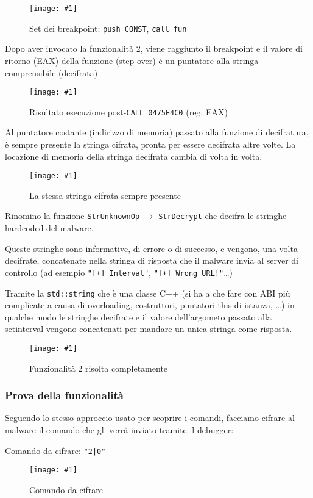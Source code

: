 \documentclass[
    a4paper, %
    11pt %
]{article}
\newcommand{\pic}[4]{\begin{figure}[H]
            \centering
            \texttt{[image: \#1]}
            \caption{#2}
            \label{fig:#1}
            \end{figure}}
\begin{document}
            \pic{adv_brkp_encfn}{Set dei breakpoint: \texttt{push CONST}, \texttt{call fun}}{15cm}{4cm}

            Dopo aver invocato la funzionalità 2, viene raggiunto il breakpoint e il valore di ritorno (EAX)
            della funzione (step over) è un puntatore alla stringa comprensibile (decifrata)

            \pic{adv_decrypt}{Risultato esecuzione post-\texttt{CALL 0475E4C0} (reg. EAX)}{18cm}{1.5cm}

            Al puntatore costante (indirizzo di memoria) passato alla funzione di decifratura, è sempre presente la stringa cifrata,
            pronta per essere decifrata altre volte. La locazione di memoria della stringa decifrata cambia
            di volta in volta.

            \pic{adv_stillenc}{La stessa stringa cifrata sempre presente}{15cm}{1.5cm}

            Rinomino la funzione \texttt{StrUnknownOp} $\rightarrow$ \texttt{StrDecrypt} che decifra le stringhe
            hardcoded del malware.

            Queste stringhe sono informative, di errore o di successo, e vengono, una volta decifrate,
            concatenate nella stringa di risposta che il malware invia al server di controllo (ad esempio
            \texttt{"[+] Interval"}, \texttt{"[+] Wrong URL!"}\dots)

            Tramite la \texttt{std::string} che è una classe C++ (si ha a che fare con ABI più complicate
            a causa di overloading, costruttori, puntatori this di istanza, \dots) in qualche modo le stringhe
            decifrate e il valore dell'argometo passato alla setinterval vengono concatenati per mandare un unica
            stringa come risposta.

            \pic{adv_2_ok}{Funzionalità 2 risolta completamente}{11cm}{5cm}

            \subsubsection{Prova della funzionalità}

            Seguendo lo stesso approccio usato per scoprire i comandi, facciamo cifrare al malware il comando
            che gli verrà inviato tramite il debugger:

            Comando da cifrare: \texttt{"2|0"}

            \pic{adv_edit}{Comando da cifrare}{5cm}{2.5cm}
\end{document}
